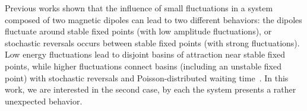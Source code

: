 Previous works shown that the influence of small fluctuations in a system composed of two magnetic dipoles can lead to two different behaviors: the dipoles fluctuate around stable fixed points (with low amplitude fluctuations), or stochastic reversals occurs between stable fixed points (with strong fluctuations). Low energy fluctuations lead to disjoint basins of attraction near stable fixed points, while higher fluctuations connect basins (including an unstable fixed point) with stochastic reversals and Poisson-distributed waiting time~\cite{StochasticReversalDynamics}. In this work, we are interested in the second case, by each the system presents a rather unexpected behavior.  




